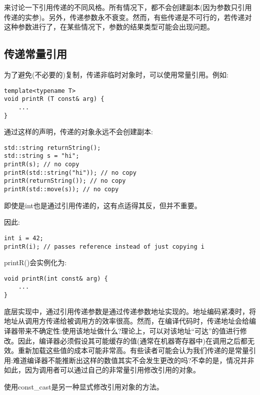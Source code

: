 
来讨论一下引用传递的不同风格。所有情况下，都不会创建副本(因为参数只引用传递的实参)。另外，传递参数永不衰变。然而，有些传递是不可行的，若传递对这种参数进行了，在某些情况下，参数的结果类型可能会出现问题。

\subsection{传递常量引用}

为了避免(不必要的)复制，传递非临时对象时，可以使用常量引用。例如:

\begin{lstlisting}[style=styleCXX]
template<typename T>
void printR (T const& arg) {
	...
}
\end{lstlisting}

通过这样的声明，传递的对象永远不会创建副本:

\begin{lstlisting}[style=styleCXX]
std::string returnString();
std::string s = "hi";
printR(s); // no copy
printR(std::string("hi")); // no copy
printR(returnString()); // no copy
printR(std::move(s)); // no copy
\end{lstlisting}

即使是int也是通过引用传递的，这有点适得其反，但并不重要。

因此:

\begin{lstlisting}[style=styleCXX]
int i = 42;
printR(i); // passes reference instead of just copying i
\end{lstlisting}

printR()会实例化为:

\begin{lstlisting}[style=styleCXX]
void printR(int const& arg) {
	...
}
\end{lstlisting}

底层实现中，通过引用传递参数是通过传递参数地址实现的。地址编码紧凑时，将地址从调用方传递给被调用方的效率很高。然而，在编译代码时，传递地址会给编译器带来不确定性:使用该地址做什么?理论上，可以对该地址“可达”的值进行修改。因此，编译器必须假设其可能缓存的值(通常在机器寄存器中)在调用之后都无效。重新加载这些值的成本可能非常高。有些读者可能会认为我们传递的是常量引用:难道编译器不能推断出这样的数值其实不会发生更改的吗?不幸的是，情况并非如此，因为调用者可以通过自己的非常量引用修改引用的对象。

\begin{tcolorbox}[colback=webgreen!5!white,colframe=webgreen!75!black]
\hspace*{0.75cm}使用const\_cast是另一种显式修改引用对象的方法。
\end{tcolorbox}

